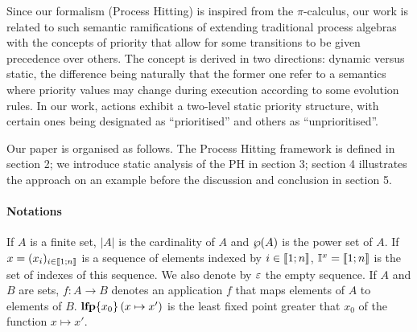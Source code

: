 Since our formalism (Process Hitting) is inspired from the $\pi$-calculus, our work is related to such semantic ramifications of extending traditional process algebras with the concepts of priority that allow for some transitions to be given precedence over others.
The concept is derived in two directions: dynamic versus static, the difference being naturally that the former one refer to a semantics where priority values may change during execution according to some evolution rules.
In our work, actions exhibit a two-level static priority structure, with certain ones being designated as “prioritised” and others as “unprioritised”.

Our paper is organised as follows.
The Process Hitting framework is defined in section 2;
we introduce static analysis of the PH in section 3;
section 4 illustrates the approach on an example
before the discussion and conclusion in section 5. 



\paragraph*{Notations}

If $A$ is a finite set,
$|A|$ is the cardinality of $A$
and $\wp(A)$ is the power set of $A$.
If $x = (x_i)_{i \in \llbracket 1; n \rrbracket}$ is a sequence of elements indexed by $i \in \llbracket 1; n \rrbracket$,
$\mathbb{I}^{x} = \llbracket 1; n \rrbracket$ is the set of indexes of this sequence.
We also denote by $\varepsilon$ the empty sequence.
If $A$ and $B$ are sets,
$f : A \rightarrow B$ denotes an application $f$ that maps elements of $A$ to elements of $B$.
$\mathbf{lfp}\{x_0\}\left(x\mapsto x'\right)$ is the least fixed point greater that $x_0$ of the function $x \mapsto x'$.
